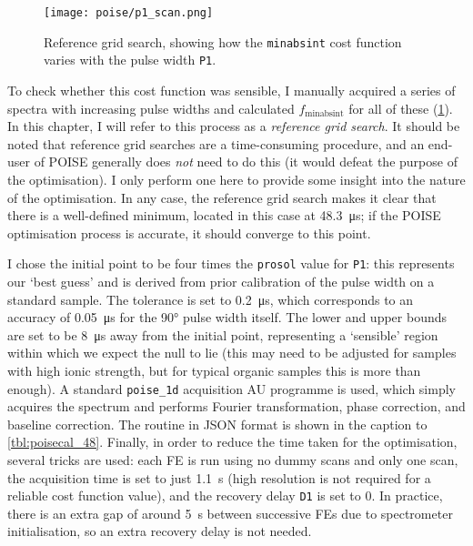 \begin{figure}[htb]
    \centering
    \texttt{[image: poise/p1\_scan.png]}%
    \caption[Reference grid search for pulse width optimisation]{
        Reference grid search, showing how the \texttt{minabsint} cost function varies with the pulse width \texttt{P1}.
    }
    \label{fig:p1_scan}
\end{figure}

To check whether this cost function was sensible, I manually acquired a series of spectra with increasing pulse widths and calculated $f_\text{minabsint}$ for all of these (\cref{fig:p1_scan}).
In this chapter, I will refer to this process as a \textit{reference grid search}.
It should be noted that reference grid searches are a time-consuming procedure, and an end-user of POISE generally does \textit{not} need to do this (it would defeat the purpose of the optimisation).
I only perform one here to provide some insight into the nature of the optimisation.
In any case, the reference grid search makes it clear that there is a well-defined minimum, located in this case at \qty{48.3}{\us}; if the POISE optimisation process is accurate, it should converge to this point.

I chose the initial point to be four times the \texttt{prosol} value for \texttt{P1}: this represents our `best guess' and is derived from prior calibration of the pulse width on a standard sample.
The tolerance is set to \qty{0.2}{\us}, which corresponds to an accuracy of \qty{0.05}{\us} for the \ang{90} pulse width itself.
The lower and upper bounds are set to be \qty{8}{\us} away from the initial point, representing a `sensible' region within which we expect the null to lie (this may need to be adjusted for samples with high ionic strength, but for typical organic samples this is more than enough).
A standard \texttt{poise\_1d} acquisition AU programme is used, which simply acquires the spectrum and performs Fourier transformation, phase correction, and baseline correction.
The routine in JSON format is shown in the caption to \cref{tbl:poisecal_48}.
Finally, in order to reduce the time taken for the optimisation, several tricks are used: each FE is run using no dummy scans and only one scan, the acquisition time is set to just \qty{1.1}{\s} (high resolution is not required for a reliable cost function value), and the recovery delay \texttt{D1} is set to 0.
In practice, there is an extra gap of around \qty{5}{\s} between successive FEs due to spectrometer initialisation, so an extra recovery delay is not needed.


